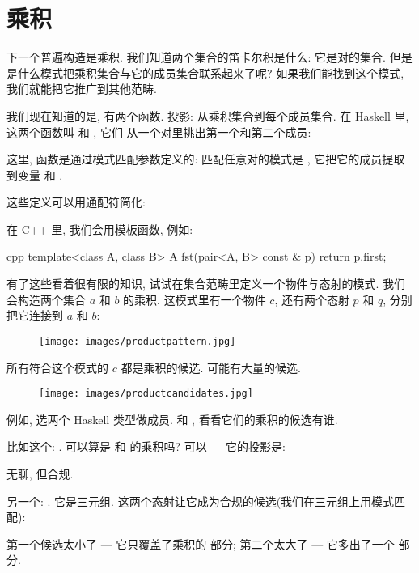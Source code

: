 \section{乘积}

下一个普遍构造是乘积. 我们知道两个集合的笛卡尔积是什么: 它是对的集合. 但是是什么模式把乘积集合与它的成员集合联系起来了呢?
如果我们能找到这个模式, 我们就能把它推广到其他范畴.

我们现在知道的是, 有两个函数. 投影: 从乘积集合到每个成员集合. 在 Haskell 里, 这两个函数叫  和 , 它们
从一个对里挑出第一个和第二个成员:


这里, 函数是通过模式匹配参数定义的: 匹配任意对的模式是 , 它把它的成员提取到变量  和 .

这些定义可以用通配符简化:

在 C++ 里, 我们会用模板函数, 例如:

\begin{snip}{cpp}
template<class A, class B> A
fst(pair<A, B> const & p) {
    return p.first;
}
\end{snip}
有了这些看着很有限的知识, 试试在集合范畴里定义一个物件与态射的模式. 我们会构造两个集合 $a$ 和 $b$ 的乘积. 这模式里有一个物件 $c$,
还有两个态射 $p$ 和 $q$, 分别把它连接到 $a$ 和 $b$:


\begin{figure}[H]
  \centering
  \texttt{[image: images/productpattern.jpg]}
\end{figure}

\noindent
所有符合这个模式的 $c$ 都是乘积的候选. 可能有大量的候选.

\begin{figure}[H]
  \centering
  \texttt{[image: images/productcandidates.jpg]}
\end{figure}

\noindent
例如, 选两个 Haskell 类型做成员.  和 , 看看它们的乘积的候选有谁.

比如这个: .  可以算是  和  的乘积吗? 可以 --- 它的投影是:

无聊, 但合规.

另一个: . 它是三元组. 这两个态射让它成为合规的候选(我们在三元组上用模式匹配):

第一个候选太小了 --- 它只覆盖了乘积的  部分; 第二个太大了 --- 它多出了一个  部分.


